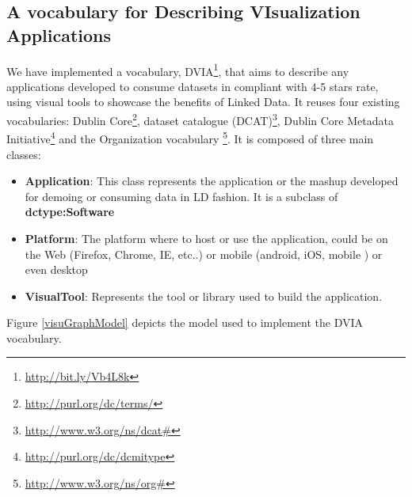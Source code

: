 \subsection{A vocabulary for Describing VIsualization Applications} \label{sec:dvia}
We have implemented a vocabulary, DVIA\footnote{\url{http://bit.ly/Vb4L8k}}, that aims to describe any applications developed to consume datasets in compliant with 4-5 stars rate, using visual tools to showcase the benefits of Linked Data. It reuses four existing vocabularies: Dublin Core\footnote{\url{http://purl.org/dc/terms/}}, dataset catalogue (DCAT)\footnote{\url{http://www.w3.org/ns/dcat\#}}, Dublin Core Metadata Initiative\footnote{\url{http://purl.org/dc/dcmitype}} and the Organization vocabulary \footnote{\url{http://www.w3.org/ns/org\#}}.  It is composed of three main classes:

\begin{itemize}
\item \textbf{Application}: This class represents the application or the mashup developed for demoing or consuming data in LD fashion. It is a subclass of \textbf{dctype:Software}
\item \textbf{Platform}: The platform where to host or use the application, could be on the Web (Firefox, Chrome, IE, etc..) or mobile (android, iOS, mobile ) or even desktop
\item \textbf{VisualTool}: Represents the tool or library used to build the application.
\end{itemize}

Figure \ref{visuGraphModel} depicts the model used to implement the DVIA vocabulary.

\begin{figure}[!htbp]
\vspace{-2.5cm}
\end{figure}

